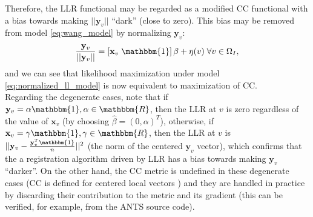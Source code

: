 Therefore, the LLR functional may be regarded as a modified CC functional with a bias towards making $||\mathbf{y}_{v}||$ ``dark'' (close to zero). This bias may be removed from model \eqref{eq:wang_model} by normalizing $\mathbf{y}_{v}$:\\
\begin{equation}\label{eq:normalized_ll_model}
    \frac{\mathbf{y}_{v}}{||\mathbf{y}_{v}||} = \left[\mathbf{x}_{v} \; \mathbbm{1}\right]\beta + \eta(v) \; \forall v\in\Omega_{I},
\end{equation}
and we can see that likelihood maximization under model \eqref{eq:normalized_ll_model} is now equivalent to maximization of CC.\\

Regarding the degenerate cases, note that if $\mathbf{y}_{v} = \alpha \mathbbm{1}, \alpha\in \mathbbm{R}$, then the LLR at $v$ is zero regardless of the value of $\mathbf{x}_{v}$ (by choosing $\widehat{\beta} = (0, \alpha)^{T}$), otherwise, if $\mathbf{x}_{v} = \gamma \mathbbm{1}, \gamma\in \mathbbm{R}$, then the LLR at $v$ is $||\mathbf{y}_{v} - \frac{\mathbf{y}_{v}^{T}\mathbbm{1}}{n}||^{2}$ (the norm of the centered $\mathbf{y}_{v}$ vector), which confirms that the a registration algorithm driven by LLR has a bias towards making $\mathbf{y}_{v}$ ``darker''. On the other hand, the CC metric is undefined in these degenerate cases (CC is defined for centered local vectors \cite{Avants2008}\cite{Avants2011}) and they are handled in practice by discarding their contribution to the metric and its gradient (this can be verified, for example, from the ANTS \cite{Avants2011a} source code).


